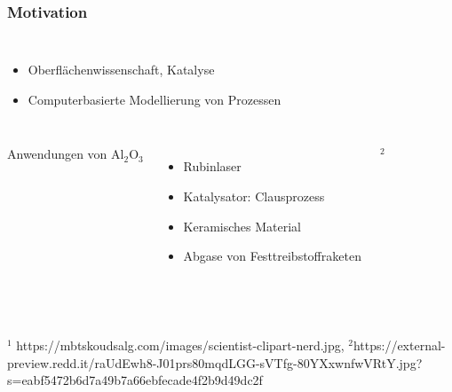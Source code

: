 \documentclass[hyperref={pdfpagelabels=false}]{beamer}
\begin{document}
\begin{frame}
 \frametitle{Motivation}
 \begin{columns}[c]
  \begin{itemize}
   \item Oberflächenwissenschaft, Katalyse
   \item Computerbasierte Modellierung von Prozessen
  \end{itemize}
 \end{columns}
 \pause
 \begin{columns}[c]
  Anwendungen von Al$_2$O$_3$
  \begin{itemize}
   \item Rubinlaser
   \item Katalysator: Clausprozess
   \item Keramisches Material
   \item Abgase von Festtreibstoffraketen
  \end{itemize}
   \tiny{$^2$} %
 \end{columns}
 ~\\
 \pause
 \\
 \tiny{$^1$ https://mbtskoudsalg.com/images/scientist-clipart-nerd.jpg, 
 $^2$https://external-preview.redd.it/raUdEwh8-J01prs80mqdLGG-sVTfg-80YXxwnfwVRtY.jpg?s=eabf5472b6d7a49b7a66ebfecade4f2b9d49dc2f}
\end{frame}
\end{document}
